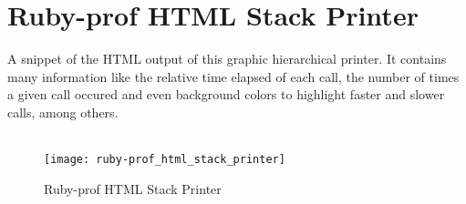 \chapter{Ruby-prof HTML Stack Printer} %
\label{ap:ruby-prof_html_stack_printer}

A snippet of the HTML output of this graphic hierarchical printer. It contains many information like the relative time elapsed of each call, the number of times a given call occured and even background colors to highlight faster and slower calls, among others.\\\\

\begin{figure}[h]
  \centering
    \texttt{[image: ruby-prof\_html\_stack\_printer]}
  \caption{Ruby-prof HTML Stack Printer}
  \label{fig:ruby-prof_html_stack_printer}
\end{figure}
